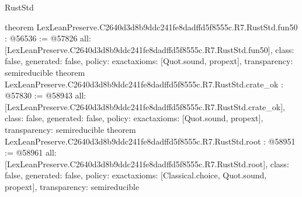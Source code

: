 \begin{lexlean}{RustStd}
\begin{coremodule}
{}
theorem LexLeanPreserve.C2640d3d8b9ddc241fe8dadffd5f8555c.R7.RustStd.fun50 : @56536 := @57826 {
  all: [LexLeanPreserve.C2640d3d8b9ddc241fe8dadffd5f8555c.R7.RustStd.fun50],
  class: false,
  generated: false,
  policy: exact{axioms: [Quot.sound, propext]},
  transparency: semireducible
}
theorem LexLeanPreserve.C2640d3d8b9ddc241fe8dadffd5f8555c.R7.RustStd.crate_ok : @57830 := @58943 {
  all: [LexLeanPreserve.C2640d3d8b9ddc241fe8dadffd5f8555c.R7.RustStd.crate_ok],
  class: false,
  generated: false,
  policy: exact{axioms: [Quot.sound, propext]},
  transparency: semireducible
}
theorem LexLeanPreserve.C2640d3d8b9ddc241fe8dadffd5f8555c.R7.RustStd.root : @58951 := @58961 {
  all: [LexLeanPreserve.C2640d3d8b9ddc241fe8dadffd5f8555c.R7.RustStd.root],
  class: false,
  generated: false,
  policy: exact{axioms: [Classical.choice, Quot.sound, propext]},
  transparency: semireducible
}


\end{coremodule}
\end{lexlean}
